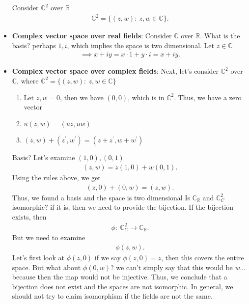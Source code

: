 \documentclass{report}
\begin{document}
\begin{itemize}
            Consider $\mathbb{C}^{2}$ over $\mathbb{R}$
            \begin{align*}
                \mathbb{C}^{2} = \{(z,w):\ z,w \in \mathbb{C}\}
            .\end{align*}
        \item \textbf{Complex vector space over real fields}: Consider $\mathbb{C}$ over $\mathbb{R}$. What is the basis? perhaps $1,i$, which implies the space is two dimensional. Let $z\in \mathbb{C}$
            \begin{align*}
                \implies x + iy = x \cdot 1 + y \cdot i = x + iy
            .\end{align*}
        \item \textbf{Complex vector space over complex fields}: Next, let's consider $\mathbb{C}^{2}$ over $\mathbb{C}$, where $\mathbb{C}^{2} = \{(z,w):\ z,w \in \mathbb{C}\} $
            \begin{enumerate}
                \item Let $z,w = 0$, then we have $(0,0)$, which is in $\mathbb{C}^{2}$. Thus, we have a zero vector
                \item $u(z,w) = (uz, uw)$
                \item $(z,w) + (z^{\prime}, w^{\prime}) = (z + z^{\prime}, w + w^{\prime})$
            \end{enumerate}
            Basis? Let's examine $(1,0), (0,1)$
            \begin{align*}
                (z,w) = z(1,0) + w(0,1)
            .\end{align*}
            Using the rules above, we get 
            \begin{align*}
                (z,0) + (0,w) = (z,w)
            .\end{align*}
            Thus, we found a basis and the space is two dimensional
            \bigbreak \noindent 
            Is $\mathbb{C}_{\mathbb{R}}$ and $\mathbb{C}^{2}_{C}$ isomorphic? if it is, then we need to provide the bijection. If the bijection exists, then
            \begin{align*}
                \phi:\ \mathbb{C}_{C}^{2} \to \mathbb{C}_{\mathbb{R}} 
            .\end{align*}
            But we need to examine
            \begin{align*}
                \phi(z,w)
            .\end{align*}
            Let's first look at $\phi(z,0)$ if we say $\phi(z,0) = z$, then this covers the entire space. But what about $\phi(0,w)$? we can't simply say that this would be $w$... because then the map would not be injective. Thus, we conclude that a bijection does not exist and the spaces are not isomorphic. In general, we should not try to claim isomorphism if the fields are not the same.

\end{itemize}
\end{document}
